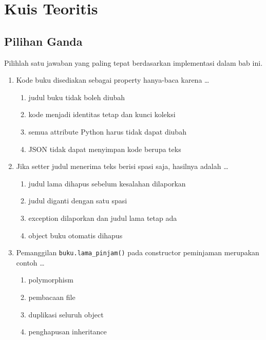 \section{Kuis Teoritis}

\subsection{Pilihan Ganda}

Pilihlah satu jawaban yang paling tepat berdasarkan implementasi dalam bab ini.

\begin{enumerate}
  \item Kode buku disediakan sebagai property hanya-baca karena \ldots
  \begin{enumerate}[label=\alph*.,itemsep=0pt]
    \item judul buku tidak boleh diubah
    \item kode menjadi identitas tetap dan kunci koleksi
    \item semua attribute Python harus tidak dapat diubah
    \item JSON tidak dapat menyimpan kode berupa teks
  \end{enumerate}
  \item Jika setter judul menerima teks berisi spasi saja, hasilnya adalah \ldots
  \begin{enumerate}[label=\alph*.,itemsep=0pt]
    \item judul lama dihapus sebelum kesalahan dilaporkan
    \item judul diganti dengan satu spasi
    \item exception dilaporkan dan judul lama tetap ada
    \item object buku otomatis dihapus
  \end{enumerate}
  \item Pemanggilan \texttt{buku.lama\_pinjam()} pada constructor peminjaman merupakan contoh \ldots
  \begin{enumerate}[label=\alph*.,itemsep=0pt]
    \item polymorphism
    \item pembacaan file
    \item duplikasi seluruh object
    \item penghapusan inheritance
  \end{enumerate}

\end{enumerate}
